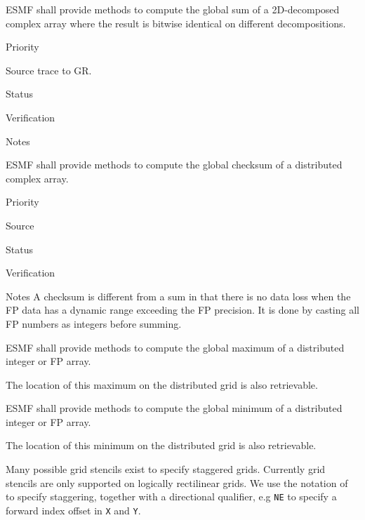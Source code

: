 ESMF shall provide methods to compute the global sum of a
2D-decomposed complex array where the result is bitwise identical on
different decompositions.

\begin{reqlist}
\item[Priority]
\item[Source] trace to GR.
\item[Status]
\item[Verification]
\item[Notes]
\end{reqlist}


ESMF shall provide methods to compute the global checksum of a
distributed complex array. 

\begin{reqlist}
\item[Priority]
\item[Source]
\item[Status]
\item[Verification]
\item[Notes] A checksum is different from a sum in that there is no
  data loss when the FP data has a dynamic range exceeding the FP
  precision. It is done by casting all FP numbers as integers before
  summing.
\end{reqlist}


ESMF shall provide methods to compute the global maximum of a
distributed integer or FP array.


The location of this maximum on the distributed grid is also
retrievable.


ESMF shall provide methods to compute the global minimum of a
distributed integer or FP array.


The location of this minimum on the distributed grid is also
retrievable.


Many possible grid stencils exist to specify staggered grids.
Currently grid stencils are only supported on logically rectilinear
grids. We use the notation of \cite{ref:a1966} to specify staggering,
together with a directional qualifier, e.g \texttt{NE} to specify a
forward index offset in \texttt{X} and \texttt{Y}.

